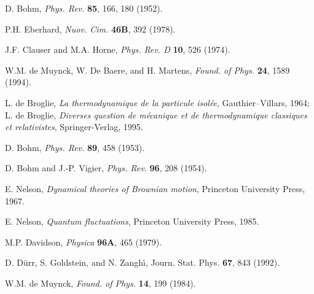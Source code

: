 \documentclass[12pt]{article}
\begin{document}
\begin{thebibliography}{10}
{D. Bohm, {\em Phys. Rev.} {\bf 85}, 166, 180 (1952).}

{P.H. Eberhard, {\em Nuov. Cim.} {\bf 46B}, 392 (1978).}

{J.F. Clauser and M.A. Horne, {\em Phys. Rev. D} {\bf 10}, 526 (1974).}

{W.M. de Muynck, W. De Baere, and H. Martens, {\em Found. of Phys.} {\bf 24},
  1589 (1994).}

{L. de Broglie, {\em La thermodynamique de la particule isol\'ee},
  Gauthier--Villars, 1964; L. de Broglie, {\em Diverses question de m\'ecanique
  et de thermodynamique classiques et relativistes}, Springer-Verlag, 1995.}

{D. Bohm, {\em Phys. Rev.} {\bf 89}, 458 (1953).}

{D. Bohm and J.-P. Vigier, {\em Phys. Rev.} {\bf 96}, 208 (1954).}

{E. Nelson, {\em Dynamical theories of Brownian motion}, Princeton University
  Press, 1967.}

{E. Nelson, {\em Quantum fluctuations}, Princeton University Press, 1985.}

{M.P. Davidson, {\em Physica} {\bf 96A}, 465 (1979).}

{D. D\"urr, S. Goldstein, and N. Zangh\'{\i}, Journ. Stat. Phys. {\bf 67}, 843
  (1992).}

{W.M. de Muynck, {\em Found. of Phys.} {\bf 14}, 199 (1984).}

\end{thebibliography}
\end{document}
